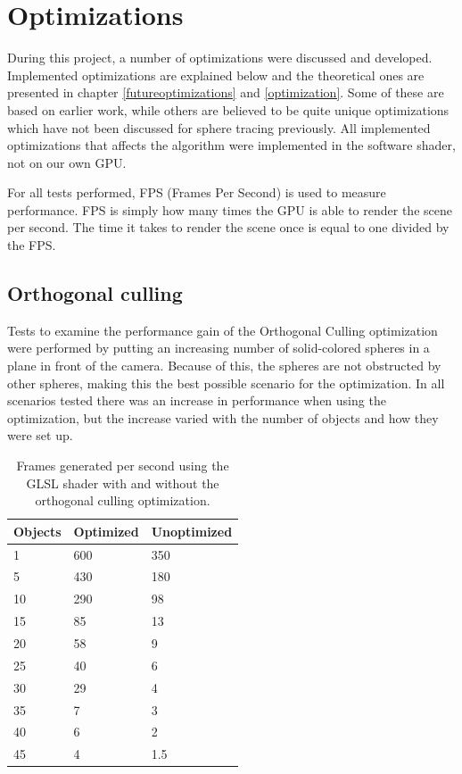 	\section{Optimizations}
		
		During this project, a number of optimizations were discussed and
		developed. Implemented optimizations are explained below and the
		theoretical ones are presented in chapter \ref{futureoptimizations} and
		\ref{optimization}. Some of these are based on earlier work, while
		others are believed to be quite unique optimizations which have not
		been discussed for sphere tracing previously. All implemented
		optimizations that affects the algorithm were implemented in the
		software shader, not on our own GPU.

		For all tests performed, FPS (Frames Per Second) is used to measure
		performance. FPS is simply how many times the GPU is able to render 
		the scene per second. The time it takes to render the scene once is 
		equal to one divided by the FPS.

		\subsection{Orthogonal culling}
		
			Tests to examine the performance gain of the Orthogonal Culling
			optimization were performed by putting an increasing number of
			solid-colored spheres in a plane in front of the camera. Because of
			this, the spheres are not obstructed by other spheres, making this
			the best possible scenario for the optimization. In all scenarios
			tested there was an increase in performance when using the
			optimization, but the increase varied with the number of objects
			and how they were set up.

			\begin{table}
			\centering
			\begin{tabular}{lll}
				\hline
				Objects & Optimized & Unoptimized \\ 
				\hline
				1       & 600       & 350         \\ 
				5       & 430       & 180         \\			
				10      & 290       & 98          \\
				15      & 85        & 13          \\
				20      & 58        & 9           \\
				25      & 40        & 6           \\
				30      & 29        & 4           \\
				35      & 7         & 3           \\
				40      & 6         & 2           \\
				45      & 4         & 1.5         \\
				\hline
			\end{tabular}
			\caption{Frames generated per second using the GLSL shader with and
				without the orthogonal culling optimization.}
			\end{table}

